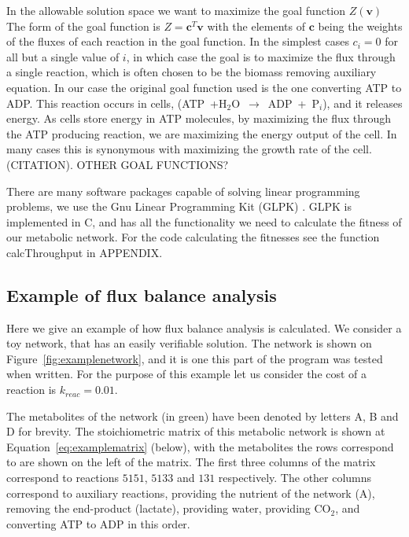\documentclass[a4paper,12pt]{article}
\begin{document}
	In the allowable solution space we want to maximize the goal function $Z \left( \mathbf{v} \right)$ The form of the goal function is $Z=\mathbf{c}^T \mathbf{v}$ with the elements of $\mathbf{c}$ being the weights of the fluxes of each reaction in the goal function. In the simplest cases $c_i=0$ for all but a single value of $i$, in which case the goal is to maximize the flux through a single reaction, which is often chosen to be the biomass removing auxiliary equation. In our case the original goal function used is the one converting ATP to ADP. This reaction occurs in cells, (ATP~+H$_2$O~$\rightarrow$~ADP~+~P$_i$), and it releases energy. As cells store energy in ATP molecules,  by maximizing the flux through the ATP producing reaction, we are maximizing the energy output of the cell. In many cases this is synonymous with maximizing the growth rate of the cell. (CITATION). OTHER GOAL FUNCTIONS?
	
	There are many software packages capable of solving linear programming problems, we use the Gnu Linear Programming Kit (GLPK) \cite{glpk}. GLPK is implemented in C, and has all the functionality we need to calculate the fitness of our metabolic network. For the code calculating the fitnesses see the function calcThroughput in APPENDIX.


\subsection{Example of flux balance analysis}
\label{sub:example_of_flux_balance_analysis}

Here we give an example of how flux balance analysis is calculated. We consider a toy network, that has an easily verifiable solution. The network is shown on Figure~\ref{fig:examplenetwork}, and it is one this part of the program was tested when written. For the purpose of this example let us consider the cost of a reaction is $k_{reac}=0.01$.


	The metabolites of the network (in green) have been denoted by letters A, B and D for brevity. The stoichiometric matrix of this metabolic network is shown at Equation~\ref{eq:examplematrix} (below), with the metabolites the rows correspond to are shown on the left of the matrix. The first three columns of the matrix correspond to reactions $5151$, $5133$ and $131$ respectively. The other columns correspond to auxiliary reactions, providing the nutrient of the network (A), removing the end-product (lactate), providing water, providing CO$_2$, and converting ATP to ADP in this order.
\end{document}
